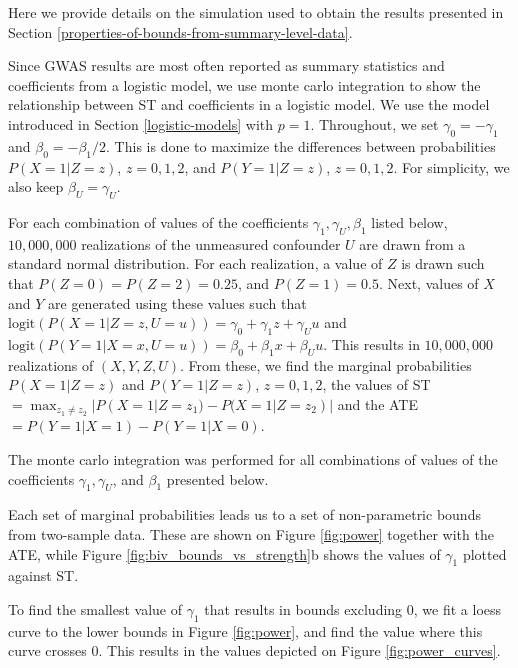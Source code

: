 \documentclass[AMA,STIX1COL,]{WileyNJD-v2}
\begin{document}
\label{appendix-sim-results}

Here we provide details on the simulation used to obtain the results
presented in Section \ref{properties-of-bounds-from-summary-level-data}.

Since GWAS results are most often reported as summary statistics and
coefficients from a logistic model, we use monte carlo integration to
show the relationship between ST and coefficients in a logistic model.
We use the model introduced in Section \ref{logistic-models} with
\(p=1\). Throughout, we set \(\gamma_0 = -\gamma_1\) and
\(\beta_0 = -\beta_1/2\). This is done to maximize the differences
between probabilities \(P(X = 1 | Z = z)\), \(z=0,1,2\), and
\(P(Y = 1 | Z = z)\), \(z=0,1,2\). For simplicity, we also keep
\(\beta_U = \gamma_U\).

For each combination of values of the coefficients
\(\gamma_1, \gamma_U, \beta_1\) listed below, \(10,000,000\)
realizations of the unmeasured confounder \(U\) are drawn from a
standard normal distribution. For each realization, a value of \(Z\) is
drawn such that \(P(Z = 0) = P(Z = 2) = 0.25\), and \(P(Z = 1) = 0.5\).
Next, values of \(X\) and \(Y\) are generated using these values such
that
\(\text{logit}(P(X = 1 | Z = z, U = u)) = \gamma_0 + \gamma_1 z + \gamma_U u\)
and
\(\text{logit}(P(Y = 1 | X = x, U = u)) = \beta_0 + \beta_1 x + \beta_U u\).
This results in \(10,000,000\) realizations of \((X,Y,Z,U)\). From
these, we find the marginal probabilities \(P(X = 1 | Z = z)\) and
\(P(Y = 1 | Z = z)\), \(z = 0,1,2\), the values of ST
\(=\max_{z_1 \neq z_2} |P(X = 1 | Z = z_1) - P(X = 1 | Z = z_2)|\) and
the ATE \(= P(Y = 1 | X = 1) - P(Y = 1 | X = 0)\).

\begin{table}[ht]
  \centering
  \caption{The monte carlo integration was performed for all combinations of values of the coefficients $\gamma_1, \gamma_U$, and $\beta_1$ presented below.}
  \label{tab:sim_coefficients}
  
\end{table}

Each set of marginal probabilities leads us to a set of non-parametric
bounds from two-sample data. These are shown on Figure \ref{fig:power}
together with the ATE, while Figure \ref{fig:biv_bounds_vs_strength}b
shows the values of \(\gamma_1\) plotted against ST.

To find the smallest value of \(\gamma_1\) that results in bounds
excluding \(0\), we fit a loess curve to the lower bounds in Figure
\ref{fig:power}, and find the value where this curve crosses \(0\). This
results in the values depicted on Figure \ref{fig:power_curves}.
\end{document}
